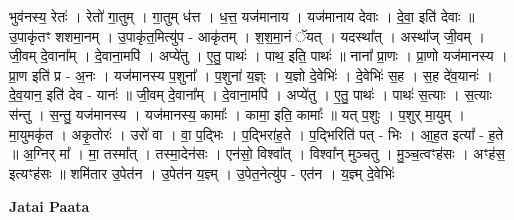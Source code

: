 \documentclass[17pt]{extarticle}
\begin{document}
भुव॑नस्य॒ रेतः॑ । रेतो॑ गा॒तुम् । गा॒तुम् ध॑त्त । ध॒त्त॒ यज॑मानाय । यज॑मानाय देवाः । दे॒वा॒ इति॑ देवाः ॥ उ॒पाकृ॑तꣳ शशमा॒नम् । उ॒पाकृ॑त॒मित्यु॑प - आकृ॑तम् । श॒श॒मा॒नं ॅयत् । यदस्था᳚त् । अस्था᳚ज् जी॒वम् । जी॒वम् दे॒वाना᳚म् । दे॒वाना॒मपि॑ । अप्ये॑तु । ए॒तु॒ पाथः॑ । पाथ॒ इति॒ पाथः॑ ॥ नाना᳚ प्रा॒णः । प्रा॒णो यज॑मानस्य । प्रा॒ण इति॑ प्र - अ॒नः । यज॑मानस्य प॒शुना᳚ । प॒शुना॑ य॒ज्ञ्ः । य॒ज्ञो दे॒वेभिः॑ । दे॒वेभिः॑ स॒ह । स॒ह दे॑व॒यानः॑ । दे॒व॒यान॒ इति॑ देव - यानः॑ ॥ जी॒वम् दे॒वाना᳚म् । दे॒वाना॒मपि॑ । अप्ये॑तु । ए॒तु॒ पाथः॑ । पाथः॑ स॒त्याः । स॒त्याः स॑न्तु । स॒न्तु॒ यज॑मानस्य । यज॑मानस्य॒ कामाः᳚ । कामा॒ इति॒ कामाः᳚ ॥ यत् प॒शुः । प॒शुर् मा॒युम् । मा॒युमकृ॑त । अकृ॒तोरः॑ । उरो॑ वा । वा॒ प॒द्भिः । प॒द्भिरा॑ह॒ते । प॒द्भिरिति॑ पत् - भिः । आ॒ह॒त इत्या᳚ - ह॒ते ॥ अ॒ग्निर् मा᳚ । मा॒ तस्मा᳚त् । तस्मा॒देन॑सः । एन॑सो॒ विश्वा᳚त् । विश्वा᳚न् मुञ्चतु । मु॒ञ्च॒त्वꣳह॑सः । अꣳह॑स॒ इत्यꣳह॑सः ॥ शमि॑तार उ॒पेत॑न । उ॒पेत॑न य॒ज्ञ्म् । उ॒पेत॒नेत्यु॑प - एत॑न । य॒ज्ञ्म् दे॒वेभिः॑ \newline

\textbf{Jatai Paata} \newline
\end{document}
